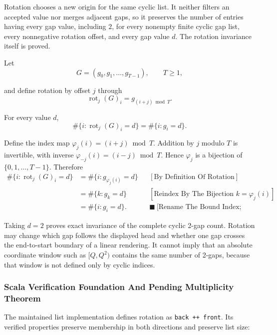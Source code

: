 Rotation chooses a new origin for the same cyclic list. It neither
filters an accepted value nor merges adjacent gaps, so it preserves the
number of entries having every gap value, including $2$, for every
nonempty finite cyclic gap list, every nonnegative rotation offset, and
every gap value $d$. The rotation invariance itself is proved.

Let
\begin{equation*}
G=(g_0,g_1,\ldots,g_{T-1}),
\qquad T\ge1,
\end{equation*}

and define rotation by offset $j$ through
\begin{equation*}
\operatorname{rot}_j(G)_i
=g_{(i+j)\bmod T}.
\end{equation*}

For every value $d$,
\begin{equation*}
\#\{i: \operatorname{rot}_j(G)_i=d\}
=\#\{i:g_i=d\}.
\end{equation*}

Define the index map $\varphi_j(i)=(i+j)\bmod T$. Addition by $j$ modulo
$T$ is invertible, with inverse $\varphi_{-j}(i)=(i-j)\bmod T$. Hence
$\varphi_j$ is a bijection of $\{0,1,\ldots,T-1\}$. Therefore
\begin{equation*}
\begin{aligned}
\#\{i:\operatorname{rot}_j(G)_i=d\}
&=\#\{i:g_{\varphi_j(i)}=d\}
&&[\text{By Definition Of Rotation}]\\
&=\#\{k:g_k=d\}
&&[\text{Reindex By The Bijection }k=\varphi_j(i)]\\
&=\#\{i:g_i=d\}.
&&\blacksquare\ \text{[Rename The Bound Index; Q.E.D.]}
\end{aligned}
\end{equation*}

Taking $d=2$ proves exact invariance of the complete cyclic 2-gap count.
Rotation may change which gap follows the displayed head and whether one
gap crosses the end-to-start boundary of a linear rendering. It cannot
imply that an absolute coordinate window such as $[Q,Q^2)$ contains the
same number of 2-gaps, because that window is not defined only by
cyclic indices.

\subsubsection*{Scala Verification Foundation And Pending Multiplicity Theorem}
\label{sec:scala-verification-foundation-rotation}

The maintained list implementation defines rotation as \texttt{back ++
front}. Its verified properties preserve membership in both directions
and preserve list size:

